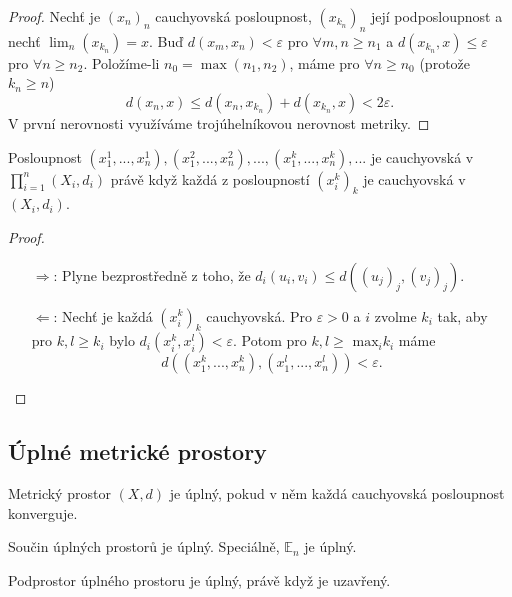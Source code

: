 \documentclass[../main.tex]{subfiles}
\begin{document}
\begin{proof}
	Nechť je $(x_n)_n$ cauchyovská posloupnost, $(x_{k_n})_n$ její podposloupnost a nechť $\lim_{n}(x_{k_n}) = x.$ Buď $d(x_m,x_n) < \varepsilon$ pro $ \forall m,n \geq n_1$ 
	a $d(x_{k_n},x) \leq \varepsilon$ pro $\forall n \geq n_2$. Položíme-li $n_0 = \max(n_1,n_2)$, máme pro $\forall n \geq n_0$ (protože $k_n \geq n$)
	\[d(x_n,x) \leq d(x_n,x_{k_n}) + d(x_{k_n},x) < 2\varepsilon.\]
	V první nerovnosti využíváme trojúhelníkovou nerovnost metriky.
\end{proof}

\begin{lemma}
	Posloupnost $(x_{1}^{1}, ... , x_{n}^{1}), (x_{1}^{2},...,x_{n}^{2}), ...,(x_{1}^{k},...,x_{n}^{k}),...$
	je cauchyovská v $\prod_{i=1}^{n}(X_i, d_i)$ právě když každá z posloupností $(x_{i}^{k})_k$ je
	cauchyovská v $(X_i, d_i)$.
\end{lemma}

\begin{proof}
	\begin{itemize}
	    \item[ $\Rightarrow$:] Plyne bezprostředně z toho, že $d_i(u_i,v_i) \leq d((u_j)_j,(v_j)_j).$
	    \item[ $\Leftarrow$:] Nechť je každá $(x_i^k)_k$ cauchyovská. Pro $\varepsilon > 0$ a $i$ zvolme $k_i$ tak,
	    aby pro $k,l \geq k_i$ bylo $d_i(x_i^k, x_i^l) < \varepsilon.$ Potom pro $k,l \geq$ $\text{max}_i k_i$ máme 
	    \[d((x_1^k,...,x_n^k),(x_1^l,...,x_n^l)) < \varepsilon.\]
	\end{itemize}
\end{proof}

\subsection{Úplné metrické prostory}

\begin{definition}
	Metrický prostor $(X,d)$ je úplný, pokud v něm každá cauchyovská posloupnost konverguje.
\end{definition}

\begin{theorem}
	Součin úplných prostorů je úplný. Speciálně, $\mathbb{E}_n$ je úplný.
\end{theorem}

\begin{lemma}
	Podprostor úplného prostoru je úplný, právě když je uzavřený.
\end{lemma}
\end{document}

